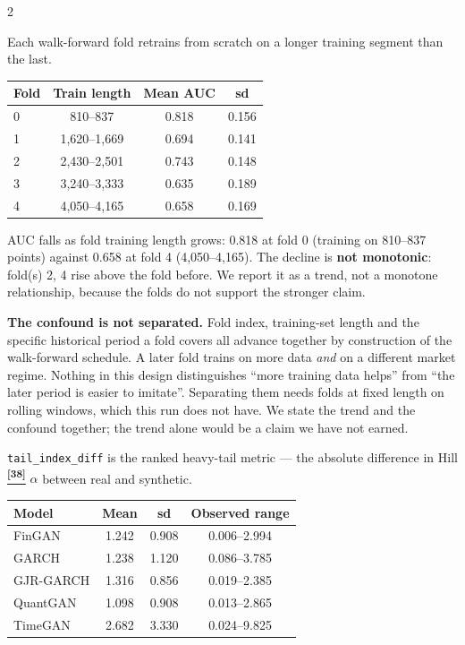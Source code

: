 \documentclass[10pt]{article}
\newcommand{\tealbox}[2]{\begin{tcolorbox}[mybox={Teal}{LBg},title={#1}]#2\end{tcolorbox}}
\newcommand{\amberbox}[2]{\begin{tcolorbox}[mybox={Amber}{ABg},title={#1}]#2\end{tcolorbox}}
\newcommand{\tcite}[1]{%
  \hyperlink{R:#1}{\textsuperscript{\scriptsize\textbf{[#1]}}}}
\begin{document}
\begin{multicols}{2}
\amberbox{The Fold-Length Effect --- and Its Confound (Table~5)}{%
Each walk-forward fold retrains from scratch on a longer training segment than the last.

\smallskip
\begin{tabular}{@{}lccc@{}}
\toprule
Fold & Train length & Mean AUC & sd \\
\midrule
0 & 810--837 & 0.818 & 0.156 \\
1 & 1,620--1,669 & 0.694 & 0.141 \\
2 & 2,430--2,501 & 0.743 & 0.148 \\
3 & 3,240--3,333 & 0.635 & 0.189 \\
4 & 4,050--4,165 & 0.658 & 0.169 \\
\bottomrule
\end{tabular}

\smallskip
AUC falls as fold training length grows: 0.818 at fold 0 (training on 810--837 points) against 0.658 at fold 4 (4,050--4,165). The decline is \textbf{not monotonic}: fold(s) 2, 4 rise above the fold before. We report it as a trend, not a monotone relationship, because the folds do not support the stronger claim.

\smallskip
\textbf{The confound is not separated.} Fold index, training-set length and the specific historical period a fold covers all advance together by construction of the walk-forward schedule. A later fold trains on more data \emph{and} on a different market regime. Nothing in this design distinguishes ``more training data helps'' from ``the later period is easier to imitate''. Separating them needs folds at fixed length on rolling windows, which this run does not have. We state the trend and the confound together; the trend alone would be a claim we have not earned.}

\columnbreak

\tealbox{Tail-Index Dispersion (Table~6)}{%
\texttt{tail\_index\_diff} is the ranked heavy-tail metric --- the absolute difference in Hill\tcite{38} $\hat\alpha$ between real and synthetic.

\smallskip
\begin{tabular}{@{}lccc@{}}
\toprule
Model & Mean & sd & Observed range \\
\midrule
FinGAN & 1.242 & 0.908 & 0.006--2.994 \\
GARCH & 1.238 & 1.120 & 0.086--3.785 \\
GJR-GARCH & 1.316 & 0.856 & 0.019--2.385 \\
QuantGAN & 1.098 & 0.908 & 0.013--2.865 \\
TimeGAN & 2.682 & 3.330 & 0.024--9.825 \\
\bottomrule
\end{tabular}

}
\end{multicols}
\end{document}
